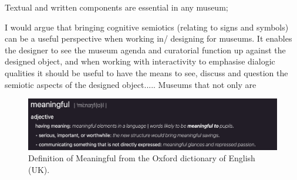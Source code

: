 Textual and written components are essential in any museum; 

I would argue that bringing cognitive semiotics (relating to signs and symbols) can be a useful perspective when working in/ designing for museums. It enables the designer to see the museum agenda and curatorial function up against the designed object, and when working with interactivity to emphasise dialogic qualities it should be useful to have the means to see, discuss and question the semiotic aspects of the designed object..... Museums that not only are 

\begin{figure}[H]
\includegraphics[width=12.5cm]{pictures/background/meaningful.png}
\caption{Definition of Meaningful from the Oxford dictionary of English (UK).}
\centering
\end{figure}

